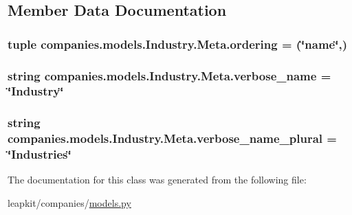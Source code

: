 \subsection{Member Data Documentation}
\hypertarget{classcompanies_1_1models_1_1_industry_1_1_meta_a249a36a0e0575620cde3cc9e1ab8df14}{
\subsubsection[{ordering}]{\setlength{\rightskip}{0pt plus 5cm}tuple companies.\-models.\-Industry.\-Meta.\-ordering = (\char`\"{}name\char`\"{},)\hspace{0.3cm}{\ttfamily [static]}}}\label{classcompanies_1_1models_1_1_industry_1_1_meta_a249a36a0e0575620cde3cc9e1ab8df14}
\hypertarget{classcompanies_1_1models_1_1_industry_1_1_meta_aafef6ba0a94954b4b72017b5d6f232e0}{
\subsubsection[{verbose\-\_\-name}]{\setlength{\rightskip}{0pt plus 5cm}string companies.\-models.\-Industry.\-Meta.\-verbose\-\_\-name = \char`\"{}Industry\char`\"{}\hspace{0.3cm}{\ttfamily [static]}}}\label{classcompanies_1_1models_1_1_industry_1_1_meta_aafef6ba0a94954b4b72017b5d6f232e0}
\hypertarget{classcompanies_1_1models_1_1_industry_1_1_meta_a60cee024a61d8c7b3a5b4c339391661c}{
\subsubsection[{verbose\-\_\-name\-\_\-plural}]{\setlength{\rightskip}{0pt plus 5cm}string companies.\-models.\-Industry.\-Meta.\-verbose\-\_\-name\-\_\-plural = \char`\"{}Industries\char`\"{}\hspace{0.3cm}{\ttfamily [static]}}}\label{classcompanies_1_1models_1_1_industry_1_1_meta_a60cee024a61d8c7b3a5b4c339391661c}


The documentation for this class was generated from the following file\-:\begin{DoxyCompactItemize}
\item 
leapkit/companies/\hyperlink{companies_2models_8py}{models.\-py}\end{DoxyCompactItemize}
